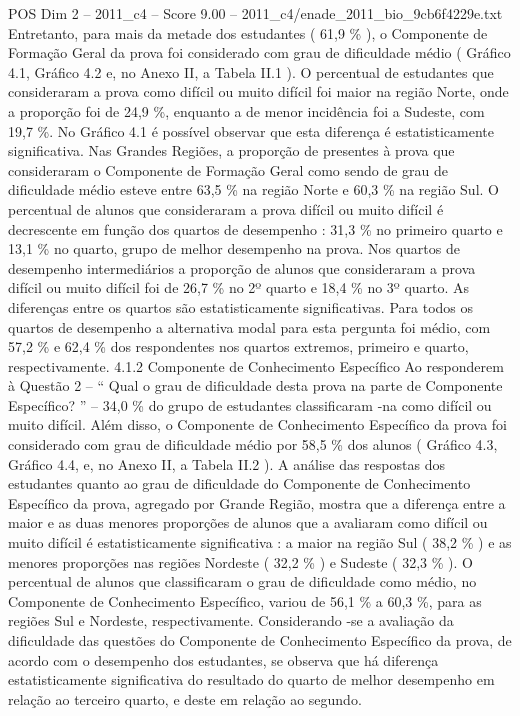 \begin{textsample}{POS Dim 2 – 2011\_c4 – Score 9.00 – 2011\_c4/enade\_2011\_bio\_9cb6f4229e.txt}
Entretanto, para mais da metade dos estudantes ( 61,9 \% ), o Componente de Formação Geral da prova foi considerado com grau de dificuldade médio ( Gráfico 4.1, Gráfico 4.2 e, no Anexo II, a Tabela II.1 ).
O percentual de estudantes que consideraram a prova como difícil ou muito difícil foi maior na região Norte, onde a proporção foi de 24,9 \%, enquanto a de menor incidência foi a Sudeste, com 19,7 \%.
No Gráfico 4.1 é possível observar que esta diferença é estatisticamente significativa.
Nas Grandes Regiões, a proporção de presentes à prova que consideraram o Componente de Formação Geral como sendo de grau de dificuldade médio esteve entre 63,5 \% na região Norte e 60,3 \% na região Sul.
O percentual de alunos que consideraram a prova difícil ou muito difícil é decrescente em função dos quartos de desempenho : 31,3 \% no primeiro quarto e 13,1 \% no quarto, grupo de melhor desempenho na prova.
Nos quartos de desempenho intermediários a proporção de alunos que consideraram a prova difícil ou muito difícil foi de 26,7 \% no 2º quarto e 18,4 \% no 3º quarto.
As diferenças entre os quartos são estatisticamente significativas.
Para todos os quartos de desempenho a alternativa modal para esta pergunta foi médio, com 57,2 \% e 62,4 \% dos respondentes nos quartos extremos, primeiro e quarto, respectivamente. 4.1.2 Componente de Conhecimento Específico Ao responderem à Questão 2 – “ Qual o grau de dificuldade desta prova na parte de Componente Específico? ” – 34,0 \% do grupo de estudantes classificaram -na como difícil ou muito difícil.
Além disso, o Componente de Conhecimento Específico da prova foi considerado com grau de dificuldade médio por 58,5 \% dos alunos ( Gráfico 4.3, Gráfico 4.4, e, no Anexo II, a Tabela II.2 ).
A análise das respostas dos estudantes quanto ao grau de dificuldade do Componente de Conhecimento Específico da prova, agregado por Grande Região, mostra que a diferença entre a maior e as duas menores proporções de alunos que a avaliaram como difícil ou muito difícil é estatisticamente significativa : a maior na região Sul ( 38,2 \% ) e as menores proporções nas regiões Nordeste ( 32,2 \% ) e Sudeste ( 32,3 \% ).
O percentual de alunos que classificaram o grau de dificuldade como médio, no Componente de Conhecimento Específico, variou de 56,1 \% a 60,3 \%, para as regiões Sul e Nordeste, respectivamente.
Considerando -se a avaliação da dificuldade das questões do Componente de Conhecimento Específico da prova, de acordo com o desempenho dos estudantes, se observa que há diferença estatisticamente significativa do resultado do quarto de melhor desempenho em relação ao terceiro quarto, e deste em relação ao segundo.

\end{textsample}
